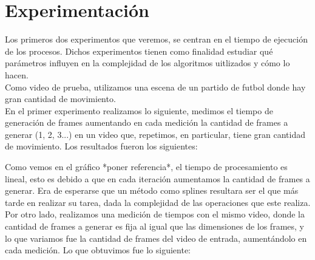 \section{Experimentación}
Los primeros dos experimentos que veremos, se centran en el tiempo de ejecución de los procesos. Dichos experimentos tienen como finalidad estudiar qué parámetros influyen en la complejidad de los algoritmos uitlizados y cómo lo hacen.\\

Como video de prueba, utilizamos una escena de un partido de futbol donde hay gran cantidad de movimiento.\\

En el primer experimento realizamos lo siguiente, medimos el tiempo de generación de frames aumentando en cada medición la cantidad de frames a generar (1, 2, 3...) en un video que, repetimos, en particular, tiene gran cantidad de movimiento. Los resultados fueron los siguientes:


Como vemos en el gráfico *poner referencia*, el tiempo de procesamiento es lineal, esto es debido a que en cada iteración aumentamos la cantidad de frames a generar. Era de esperarse que un método como splines resultara ser el que más tarde en realizar su tarea, dada la complejidad de las operaciones que este realiza. \\

Por otro lado, realizamos una medición de tiempos con el mismo video, donde la cantidad de frames a generar es fija al igual que las dimensiones de los frames, y lo que variamos fue la cantidad de frames del video de entrada, aumentándolo en cada medición. Lo que obtuvimos fue lo siguiente:


